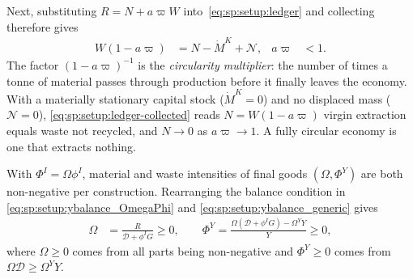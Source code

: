 Next, substituting $R=N+a\varpi W$ into~\eqref{eq:sp:setup:ledger} and collecting therefore gives
\begin{align}
W\left(1-a\varpi\right) &= N-\dot M^K+\mathcal N,
&
a\varpi&<1 .
\label{eq:sp:setup:ledger-collected}
\end{align}
The factor $\left(1-a\varpi\right)^{-1}$ is the \emph{circularity multiplier}: the number of times a tonne of material passes through production before it finally leaves the economy. With a materially stationary capital stock ($\dot M^K=0$) and no displaced mass ($\mathcal N=0$), \eqref{eq:sp:setup:ledger-collected} reads $N=W\left(1-a\varpi\right)$ virgin extraction equals waste not recycled, and $N\to0$ as $a\varpi\to1$. A fully circular economy is one that extracts nothing. 



With $\Phi^I = \Omega \phi^I$, material and waste intensities of final goods $(\Omega, \Phi^Y)$ are both non-negative per construction. Rearranging the balance condition in \eqref{eq:sp:setup:ybalance_OmegaPhi} and \eqref{eq:sp:setup:ybalance_generic} gives
\begin{align}
\Omega &= \frac{R}{\mathcal D+\phi^IG}\geq0, \qquad \Phi^Y = \frac{\Omega\left(\mathcal D + \phi^I G\right) - \Omega^Y Y}{Y}\geq0, 
\label{eq:sp:setup:Omega-phi}
\end{align}
where $\Omega\geq0$ comes from all parts being non-negative and $\Phi^Y\geq0$ comes from $\Omega \mathcal{D}\geq \Omega^Y Y$.
